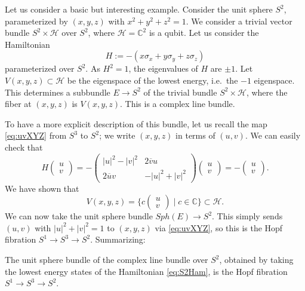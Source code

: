 \documentclass[12pt]{article}
\numberwithin{equation}{section}
\theoremstyle{remark}
\def\bC{\mathbb{C}}
\def\cH{\mathcal{H}}
\let\bar\overline
\begin{document}
Let us consider a basic but interesting example.
Consider the unit sphere $S^2$, parameterized by $(x,y,z)$ with $x^2+y^2+z^2=1$.
We consider a trivial vector bundle $S^2\times \cH$ over $S^2$,
where $\cH=\bC^2$ is a qubit.
Let us consider the Hamiltonian \begin{equation}
  H := -(x\sigma_x +y \sigma_y + z\sigma_z)
  \label{eq:S2Ham}
\end{equation} parameterized over $S^2$.
As $H^2=1$, the eigenvalues of $H$ are $\pm 1$.
Let $V(x,y,z) \subset \cH$ be the eigenspace of the lowest energy, i.e.~the $-1$ eigenspace.
This determines a subbundle $E \to S^2 $ of the trivial bundle $S^2\times \cH$,
where the fiber at $(x,y,z)$ is $V(x,y,z)$.
This is a complex line bundle.

To have a more explicit description of this bundle,
let us recall the map \eqref{eq:uvXYZ} from $S^3$ to $S^2$;
we write $(x,y,z)$ in terms of $(u,v)$.
We can easily check that 
\begin{equation}
H \begin{pmatrix}
u\\ v
\end{pmatrix}
=
- \begin{pmatrix}
|u|^2-|v|^2 & 2\bar v u \\
2 \bar u v & -|u|^2+|v|^2
\end{pmatrix}
\begin{pmatrix}
  u\\ v
  \end{pmatrix}
=
-\begin{pmatrix}
  u\\ v
\end{pmatrix}.
\end{equation}
We have shown that 
\begin{equation}
  V(x,y,z)= \{ c\begin{pmatrix}
    u\\ v
  \end{pmatrix}  \mid c\in \bC \} \subset \cH.
\end{equation} 
We can now take the unit sphere bundle $Sph(E)\to S^2$.
This simply sends $(u,v)$ with $|u|^2+|v|^2=1$ to $(x,y,z)$ via \eqref{eq:uvXYZ},
so this is the Hopf fibration $S^1\to S^3\to S^2$.
Summarizing:
\begin{example}
  \label{ex:S2parameterized}
  The unit sphere bundle 
  of the complex line bundle over $S^2$,
  obtained by taking the lowest energy states 
  of the Hamiltonian \eqref{eq:S2Ham},
  is the Hopf fibration $S^1\to S^3\to S^2$.
\end{example}
\end{document}
